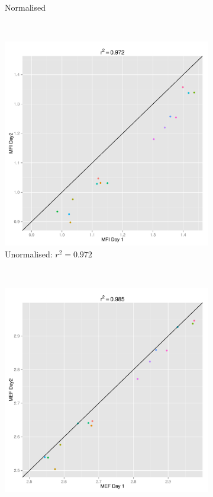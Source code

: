 \begin{figure}
\begin{subfigure}[b]{.4\textwidth}
    \caption{Normalised}
\end{subfigure}
~
\begin{subfigure}[b]{.4\textwidth}
    \centering
    \includegraphics[scale=.3]{figures/CD25-MFI-repeatability.pdf}
    \caption{Unormalised: $r^2=0.972$}
\end{subfigure}
~
\begin{subfigure}[b]{.4\textwidth}
    \centering
    \includegraphics[scale=.3]{figures/CD25-MFI-beads-normalised.pdf}

\end{subfigure}
\end{figure}
